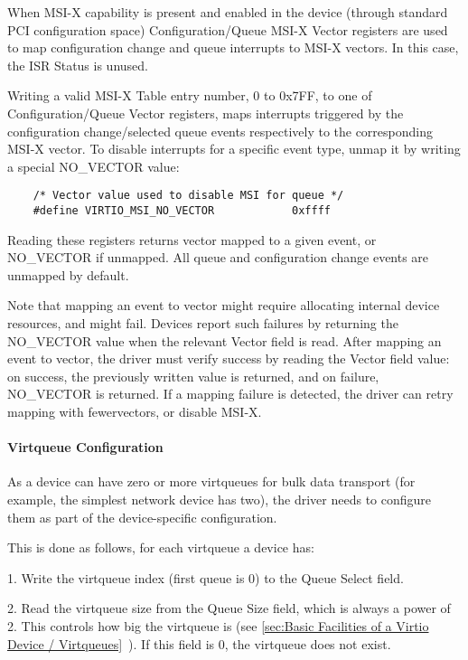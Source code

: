 When MSI-X capability is present and enabled in the device
(through standard PCI configuration space) Configuration/Queue
MSI-X Vector registers are used to map configuration change and queue
interrupts to MSI-X vectors. In this case, the ISR Status is unused.

Writing a valid MSI-X Table entry number, 0 to 0x7FF, to one of
Configuration/Queue Vector registers, maps interrupts triggered
by the configuration change/selected queue events respectively to
the corresponding MSI-X vector. To disable interrupts for a
specific event type, unmap it by writing a special NO_VECTOR
value:

\begin{lstlisting}
	/* Vector value used to disable MSI for queue */
	#define VIRTIO_MSI_NO_VECTOR            0xffff
\end{lstlisting}

Reading these registers returns vector mapped to a given event,
or NO_VECTOR if unmapped. All queue and configuration change
events are unmapped by default.

Note that mapping an event to vector might require allocating
internal device resources, and might fail. Devices report such
failures by returning the NO_VECTOR value when the relevant
Vector field is read. After mapping an event to vector, the
driver must verify success by reading the Vector field value: on
success, the previously written value is returned, and on
failure, NO_VECTOR is returned. If a mapping failure is detected,
the driver can retry mapping with fewervectors, or disable MSI-X.

\paragraph{Virtqueue Configuration}\label{sec:Virtio Transport Options / Virtio Over PCI Bus / PCI-specific Initialization And Device Operation / Device Initialization / Virtqueue Configuration}

As a device can have zero or more virtqueues for bulk data
transport (for example, the simplest network device has two), the driver
needs to configure them as part of the device-specific
configuration.

This is done as follows, for each virtqueue a device has:

1. Write the virtqueue index (first queue is 0) to the Queue
  Select field.

2. Read the virtqueue size from the Queue Size field, which is
  always a power of 2. This controls how big the virtqueue is
  (see \ref{sec:Basic Facilities of a Virtio Device / Virtqueues}~). If this field is 0, the virtqueue does not exist.


